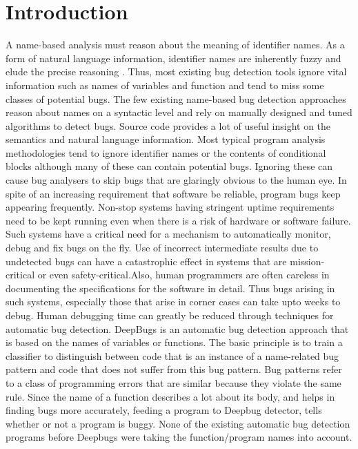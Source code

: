 \documentclass[sigconf]{acmart}
\begin{document}
\section{Introduction}
A name-based analysis must reason about the meaning of identifier names. As a form of natural language information, identifier names are inherently fuzzy and elude the precise reasoning . Thus, most existing bug detection tools ignore vital information such as names of variables and function and tend to miss some classes of potential bugs.
The few existing name-based bug detection approaches reason about names on a syntactic level and rely on manually designed and tuned algorithms to detect bugs.  Source code provides a lot of useful insight on the semantics and natural language information. Most typical program analysis methodologies tend to ignore identifier names or the contents of conditional blocks although many of these can contain potential bugs. Ignoring these can cause bug analysers to skip bugs that are glaringly obvious to the human eye.
\newline In spite of an increasing requirement that software be reliable, program bugs keep appearing frequently. Non-stop systems having stringent uptime requirements \cite{hangal} need to be kept running even when there is a risk of hardware or software failure. Such systems have a critical need for a mechanism to automatically monitor, debug and fix bugs on the fly. Use of incorrect intermediate results due to undetected bugs can have a catastrophic effect in systems that are mission-critical or even safety-critical.Also, human programmers are often careless in documenting the specifications for the software in detail. Thus bugs arising in such systems, especially those that arise in corner cases can take upto weeks to debug. Human debugging time can greatly be reduced  through techniques for automatic bug detection. 
\newline DeepBugs is an automatic bug detection approach that is based on the names of variables or functions. The basic principle is to train a classifier to distinguish between code that is an instance of a name-related bug pattern and code that does not suffer from this bug pattern. Bug patterns refer to a class of programming errors that are similar because they violate the same rule. Since the name of a function describes a lot about its body, and helps in  finding bugs more accurately, feeding a program to Deepbug detector,  tells whether or not a program is buggy. None of the existing automatic bug detection programs before Deepbugs were taking the function/program names into account.
\end{document}

